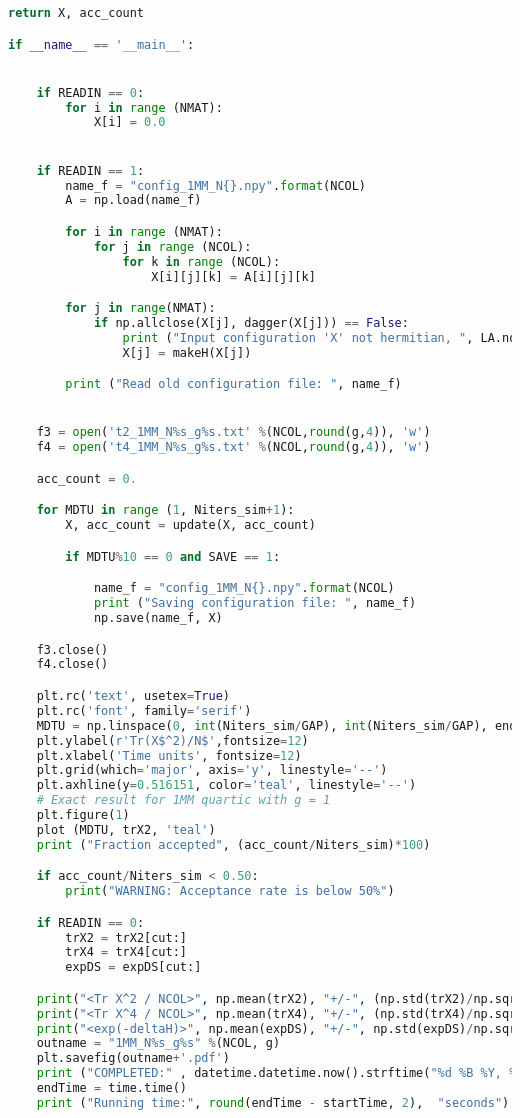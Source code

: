 \begin{footnotesize}
\begin{lstlisting}[language=Python]
    return X, acc_count

if __name__ == '__main__':


    if READIN == 0:
        for i in range (NMAT): 
            X[i] = 0.0  


    if READIN == 1:
        name_f = "config_1MM_N{}.npy".format(NCOL)
        A = np.load(name_f)

        for i in range (NMAT):
            for j in range (NCOL):
                for k in range (NCOL):
                    X[i][j][k] = A[i][j][k]

        for j in range(NMAT):
            if np.allclose(X[j], dagger(X[j])) == False:
                print ("Input configuration 'X' not hermitian, ", LA.norm(X[j] - dagger(X[j])), "making it so")
                X[j] = makeH(X[j])

        print ("Read old configuration file: ", name_f)


    f3 = open('t2_1MM_N%s_g%s.txt' %(NCOL,round(g,4)), 'w')
    f4 = open('t4_1MM_N%s_g%s.txt' %(NCOL,round(g,4)), 'w')

    acc_count = 0.

    for MDTU in range (1, Niters_sim+1):
        X, acc_count = update(X, acc_count)

        if MDTU%10 == 0 and SAVE == 1:

            name_f = "config_1MM_N{}.npy".format(NCOL)
            print ("Saving configuration file: ", name_f)
            np.save(name_f, X)

    f3.close()
    f4.close()

    plt.rc('text', usetex=True)
    plt.rc('font', family='serif')
    MDTU = np.linspace(0, int(Niters_sim/GAP), int(Niters_sim/GAP), endpoint=True)
    plt.ylabel(r'Tr(X$^2)/N$',fontsize=12)
    plt.xlabel('Time units', fontsize=12)
    plt.grid(which='major', axis='y', linestyle='--')
    plt.axhline(y=0.516151, color='teal', linestyle='--')
    # Exact result for 1MM quartic with g = 1
    plt.figure(1)
    plot (MDTU, trX2, 'teal') 
    print ("Fraction accepted", (acc_count/Niters_sim)*100) 

    if acc_count/Niters_sim < 0.50:
        print("WARNING: Acceptance rate is below 50%")

    if READIN == 0:
        trX2 = trX2[cut:]
        trX4 = trX4[cut:]
        expDS = expDS[cut:] 

    print("<Tr X^2 / NCOL>", np.mean(trX2), "+/-", (np.std(trX2)/np.sqrt(np.size(trX2) - 1.0)))
    print("<Tr X^4 / NCOL>", np.mean(trX4), "+/-", (np.std(trX4)/np.sqrt(np.size(trX4) - 1.0)))
    print("<exp(-deltaH)>", np.mean(expDS), "+/-", np.std(expDS)/np.sqrt(np.size(expDS) - 1.0))
    outname = "1MM_N%s_g%s" %(NCOL, g)
    plt.savefig(outname+'.pdf')
    print ("COMPLETED:" , datetime.datetime.now().strftime("%d %B %Y, %H:%M:%S"))
    endTime = time.time() 
    print ("Running time:", round(endTime - startTime, 2),  "seconds")
\end{lstlisting}
\end{footnotesize} 